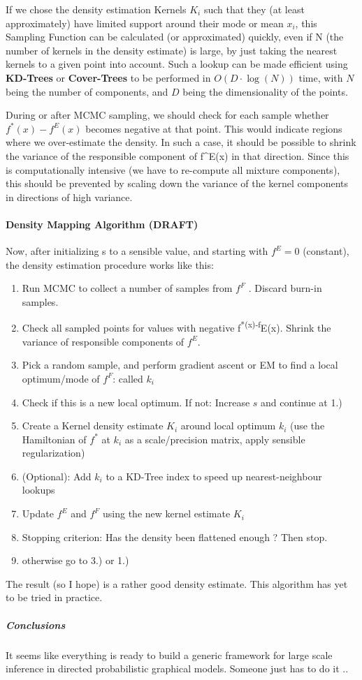 \documentclass[letterpaper,10pt,english]{/home/londenberg/python-env/clean/lib/python2.7/site-packages/sphinx/texinputs/sphinxhowto}
\begin{document}
If we chose the density estimation Kernels $K_i$ such that they (at
least approximately) have limited support around their mode or mean
$x_i$, this Sampling Function can be calculated (or approximated)
quickly, even if N (the number of kernels in the density estimate) is
large, by just taking the nearest kernels to a given point into account.
Such a lookup can be made efficient using \textbf{KD-Trees} or
\textbf{Cover-Trees} to be performed in $O(D \cdot \log(N))$ time, with
$N$ being the number of components, and $D$ being the dimensionality of
the points.

During or after MCMC sampling, we should check for each sample whether
$f^*(x)-f^E(x)$ becomes negative at that point. This would indicate
regions where we over-estimate the density. In such a case, it should be
possible to shrink the variance of the responsible component of
f\^{}E(x) in that direction. Since this is computationally intensive (we
have to re-compute all mixture components), this should be prevented by
scaling down the variance of the kernel components in directions of high
variance.\paragraph{Density Mapping Algorithm (DRAFT)}

Now, after initializing s to a sensible value, and starting with $f^E=0$
(constant), the density estimation procedure works like this:

\begin{enumerate}[1.]
\item
  Run MCMC to collect a number of samples from $f^F$ . Discard burn-in
  samples.
\item
  Check all sampled points for values with negative
  f\textsuperscript{*(x)-f}E(x). Shrink the variance of responsible
  components of $f^E$.
\item
  Pick a random sample, and perform gradient ascent or EM to find a
  local optimum/mode of $f^F$: called $k_i$
\item
  Check if this is a new local optimum. If not: Increase $s$ and
  continue at 1.)
\item
  Create a Kernel density estimate $K_i$ around local optimum $k_i$ (use
  the Hamiltonian of $f^*$ at $k_i$ as a scale/precision matrix, apply
  sensible regularization)
\item
  (Optional): Add $k_i$ to a KD-Tree index to speed up nearest-neighbour
  lookups
\item
  Update $f^E$ and $f^F$ using the new kernel estimate $K_i$
\item
  Stopping criterion: Has the density been flattened enough ? Then stop.
\item
  otherwise go to 3.) or 1.)
\end{enumerate}
The result (so I hope) is a rather good density estimate. This algorithm
has yet to be tried in practice.\subparagraph{Conclusions}

It seems like everything is ready to build a generic framework for large
scale inference in directed probabilistic graphical models. Someone just
has to do it ..
        

        \renewcommand{\indexname}{Index}
        \printindex

    
\end{document}
